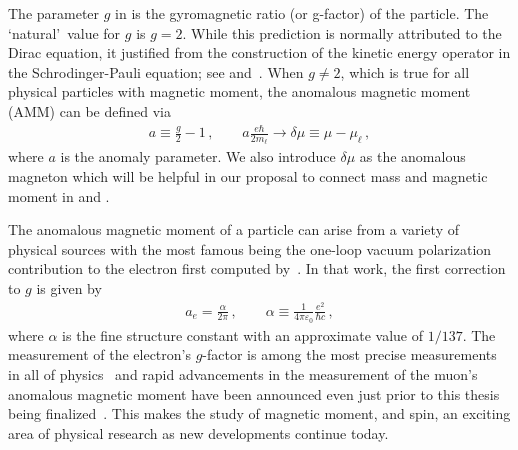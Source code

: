The parameter $g$ in  is the gyromagnetic ratio (or g-factor) of the particle. The \lq natural\rq\ value for $g$ is $g=2$. While this prediction is normally attributed to the Dirac equation, it justified from the construction of the kinetic energy operator in the Schrodinger-Pauli equation; see  and~\cite{sakurai1967advanced}. When $g\neq2$, which is true for all physical particles with magnetic moment, the anomalous magnetic moment (AMM) can be defined via 
\begin{align}
    \label{amm:1}
    a\equiv\frac{g}{2}-1\,,\qquad
    a\frac{e\hbar}{2m_{\ell}}\rightarrow\delta\mu\equiv\mu-\mu_{\ell}\,,
\end{align}
where $a$ is the anomaly parameter. We also introduce $\delta\mu$ as the anomalous magneton which will be helpful in our proposal to connect mass and magnetic moment in  and .

The anomalous magnetic moment of a particle can arise from a variety of physical sources with the most famous being the one-loop vacuum polarization contribution to the electron first computed by~\cite{Schwinger:1951nm}. In that work, the first correction to $g$ is given by
\begin{align}
    a_{e} = \frac{\alpha}{2\pi}\,,\qquad
    \alpha\equiv\frac{1}{4\pi\varepsilon_{0}}\frac{e^{2}}{\hbar c}\,,
\end{align}
where $\alpha$ is the fine structure constant with an approximate value of $1/137$. The measurement of the electron's $g$-factor is among the most precise measurements in all of physics~\citep{Tiesinga:2021myr} and rapid advancements in the measurement of the muon's anomalous magnetic moment have been announced even just prior to this thesis being finalized~\citep{Muong-2:2023cdq}. This makes the study of magnetic moment, and spin, an exciting area of physical research as new developments continue today.

